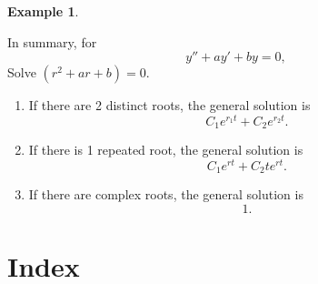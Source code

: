 \documentclass[a5paper]{article}
\theoremstyle{definition}%
\newtheorem*{example*}{Example}
\numberwithin{exercise}{section}
\theoremstyle{remark}%
\begin{document}
\begin{example*}
\begin{highlight}
In summary, for 
\[y''+ay'+by=0,\]
Solve $(r^2+ar+b)=0$.
\begin{enumerate}%
\item If there are 2 distinct roots, the general solution is 
$$C_1e^{r_1t}+C_2e^{r_2t}.$$
\item If there is 1 repeated root, the general solution is 
$$C_1e^{rt}+C_2te^{rt}.$$
\item If there are complex roots, the general solution is 
$$1.$$

\end{enumerate}
\end{highlight}



\end{example*}









\pagebreak
\section{Index}
\printindex
\end{document}
